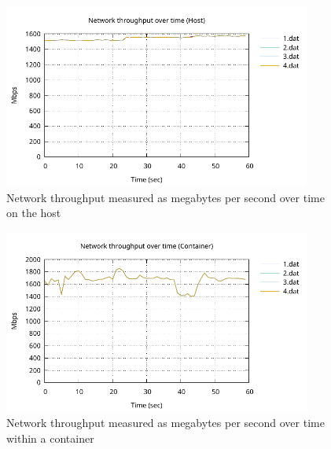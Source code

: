 \begin{figure}[H]
    \centering
    \includegraphics[width=0.9\textwidth]{images/results/network-host-throughput.pdf}
    \caption{Network throughput measured as megabytes per second over time on the host}
    \label{images:experiment/network-host-throughput.pdf}
\end{figure}

\begin{figure}[H]
    \centering
    \includegraphics[width=0.9\textwidth]{images/results/network-throughput-container.pdf}
    \caption{Network throughput measured as megabytes per second over time within a container}
    \label{images:experiment/network-throughput-container.pdf}
\end{figure}

